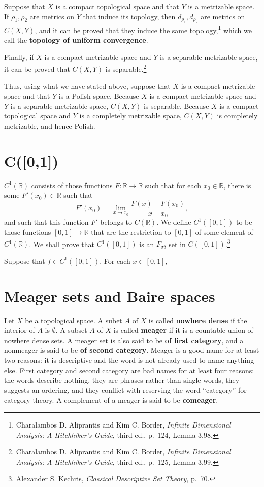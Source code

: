 \documentclass{article}
\theoremstyle{definition}
\begin{document}
Suppose that $X$ is a compact topological space and that $Y$ is a  metrizable space. 
If $\rho_1,\rho_2$ are metrics on $Y$ that induce its topology,
then $d_{\rho_1},d_{\rho_2}$ are metrics on $C(X,Y)$, and it can be proved
that they induce the same topology,\footnote{Charalambos D. 
Aliprantis and Kim C. Border, {\em Infinite Dimensional Analysis: A Hitchhiker's Guide}, third ed., p.~124,
Lemma 3.98.}  which we call the \textbf{topology of uniform convergence}. 


Finally, if $X$ is a compact metrizable space and $Y$ is a separable metrizable space, it can be proved that
$C(X,Y)$ is separable.\footnote{Charalambos D. 
Aliprantis and Kim C. Border, {\em Infinite Dimensional Analysis: A Hitchhiker's Guide}, third ed., p.~125,
Lemma 3.99.} 

Thus, using what we have stated above, suppose that $X$ is a compact metrizable space and that $Y$ is a Polish
space. Because $X$ is a compact metrizable space and $Y$ is a separable metrizable space, $C(X,Y)$
is separable. Because $X$ is a compact topological space and $Y$ is a completely metrizable space,
$C(X,Y)$ is completely metrizable, and hence Polish.


\section{C([0,1])}
$C^1(\mathbb{R})$ consists of those functions $F:\mathbb{R} \to \mathbb{R}$ such that for each $x_0 \in \mathbb{R}$, there is some 
$F'(x_0) \in \mathbb{R}$ such that
\[
F'(x_0)= \lim_{x \to x_0} \frac{F(x)-F(x_0)}{x-x_0},
\]
and such that this function $F'$ belongs to $C(\mathbb{R})$. We define $C^1([0,1])$ to be those functions $[0,1] \to \mathbb{R}$ that are the restriction
to $[0,1]$ of some element of $C^1(\mathbb{R})$. 
We shall prove that $C^1([0,1])$ is an $F_{\sigma \delta}$ set in $C([0,1])$.\footnote{Alexander S. Kechris, {\em Classical Descriptive Set Theory}, p.~70.}

Suppose that $f \in C^1([0,1])$. For each $x \in [0,1]$, 




\section{Meager sets and Baire spaces}
Let $X$ be a topological space.  A subet $A$ of $X$ is called \textbf{nowhere dense} if 
the interior of $\overline{A}$ is $\emptyset$. A subset $A$ of $X$ is called \textbf{meager} if it is a countable union of nowhere dense sets. A meager
set is also said to be \textbf{of first category}, and a nonmeager is said to be \textbf{of second category}.
Meager is a good name  for at least two reasons: it is descriptive and  the word is not already used to name anything else.
First category and second category are bad names for at least four reasons: the words describe nothing, they are phrases rather than single
words, they suggests an ordering, and they conflict with
reserving the word ``category'' for category theory. 
A complement of a meager  is said to be \textbf{comeager}. 
\end{document}
